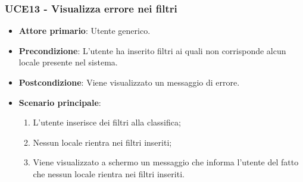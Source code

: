 \subsubsection{UCE13 - Visualizza errore nei filtri}
\begin{itemize}
    \item \textbf{Attore primario}: Utente generico.
    \item \textbf{Precondizione}: L'utente ha inserito filtri ai quali non corrisponde alcun locale presente nel sistema.
    \item \textbf{Postcondizione}: Viene visualizzato un messaggio di errore.
    \item \textbf{Scenario principale}: 
    \begin{enumerate}
        \item L'utente inserisce dei filtri alla classifica;
        \item Nessun locale rientra nei filtri inseriti;
        \item Viene visualizzato a schermo un messaggio che informa l'utente del fatto che nessun locale rientra nei filtri inseriti.
    \end{enumerate}
\end{itemize}